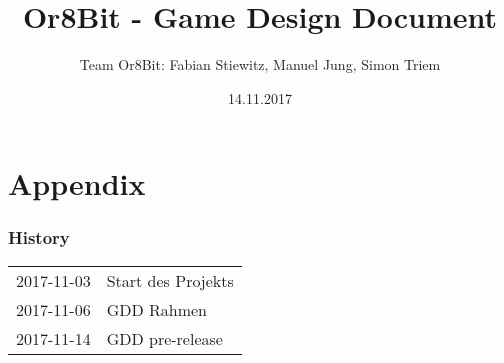 \documentclass[a4paper,12pt]{article}
\title{Or8Bit - Game Design Document}
\author{Team Or8Bit: Fabian Stiewitz, Manuel Jung, Simon Triem}
\date{14.11.2017}
\begin{document}
\maketitle
\newpage
\tableofcontents
\newpage









\appendix
\part{Appendix}

\section{History}
\begin{tabularx}{\textwidth}{ l X }
  2017-11-03 & Start des Projekts \\
  2017-11-06 & GDD Rahmen \\
  2017-11-14 & GDD pre-release \\
\end{tabularx}
\newpage
\printindex
\end{document}
